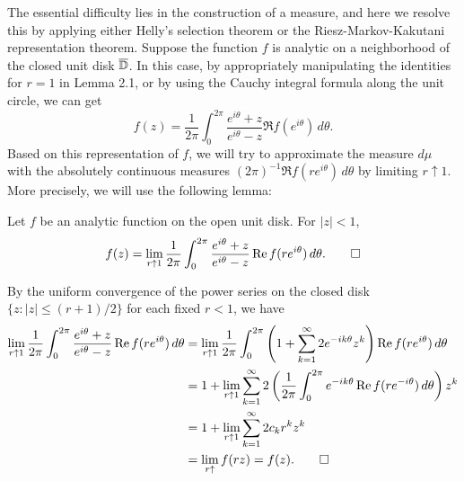 \documentclass{../../small}
\begin{document}
The essential difficulty lies in the construction of a measure, and here we resolve this by applying either Helly's selection theorem or the Riesz-Markov-Kakutani representation theorem.
Suppose the function $f$ is analytic on a neighborhood of the closed unit disk $\bar\D$.
In this case, by appropriately manipulating the identities for $r=1$ in Lemma 2.1, or by using the Cauchy integral formula along the unit circle, we can get
\[f(z)=\frac1{2\pi}\int_0^{2\pi}\frac{e^{i\theta}+z}{e^{i\theta}-z}\Re f(e^{i\theta})\,d\theta.\]
Based on this representation of $f$, we will try to approximate the measure $d\mu$ with the absolutely continuous measures $(2\pi)^{-1}\Re f(re^{i\theta})\,d\theta$ by limiting $r\uparrow1$.
More precisely, we will use the following lemma:
\begin{lem}
Let $f$ be an analytic function on the open unit disk.
For $|z|<1$,
\[f(z)=\lim_{r\uparrow1}\frac1{2\pi}\int_0^{2\pi}\frac{e^{i\theta}+z}{e^{i\theta}-z}\Re f(re^{i\theta})\,d\theta.\qedhere\]
\end{lem}
\begin{pf}
By the uniform convergence of the power series on the closed disk $\{z:|z|\le(r+1)/2\}$ for each fixed $r<1$, we have
\begin{align*}
\lim_{r\uparrow1}\frac1{2\pi}\int_0^{2\pi}\frac{e^{i\theta}+z}{e^{i\theta}-z}\Re f(re^{i\theta})\,d\theta
&=\lim_{r\uparrow1}\frac1{2\pi}\int_0^{2\pi}\left(1+\sum_{k=1}^\infty2e^{-ik\theta}z^k\right)\Re f(re^{i\theta})\,d\theta\\
&=1+\lim_{r\uparrow1}\sum_{k=1}^\infty2\left(\frac1{2\pi}\int_0^{2\pi}e^{-ik\theta}\Re f(re^{-i\theta})\,d\theta\right)z^k\\
&=1+\lim_{r\uparrow1}\sum_{k=1}^\infty2c_kr^kz^k\\
&=\lim_{r\uparrow}f(rz)=f(z).\qedhere
\end{align*}
\end{pf}
\end{document}
